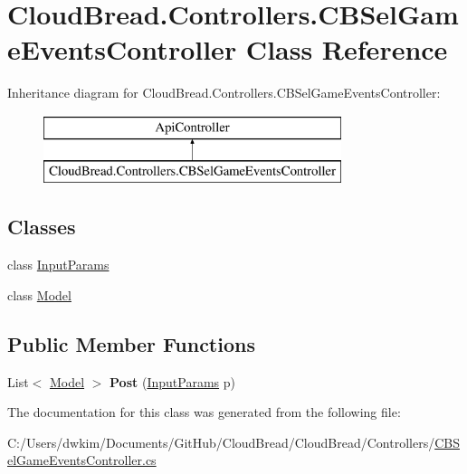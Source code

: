 \hypertarget{a00046}{}\section{Cloud\+Bread.\+Controllers.\+C\+B\+Sel\+Game\+Events\+Controller Class Reference}
\label{a00046}
Inheritance diagram for Cloud\+Bread.\+Controllers.\+C\+B\+Sel\+Game\+Events\+Controller\+:\begin{figure}[H]
\begin{center}
\leavevmode
\includegraphics[height=2.000000cm]{a00046}
\end{center}
\end{figure}
\subsection*{Classes}
\begin{DoxyCompactItemize}
\item 
class \hyperlink{a00119}{Input\+Params}
\item 
class \hyperlink{a00166}{Model}
\end{DoxyCompactItemize}
\subsection*{Public Member Functions}
\begin{DoxyCompactItemize}
\item 
List$<$ \hyperlink{a00166}{Model} $>$ {\bfseries Post} (\hyperlink{a00119}{Input\+Params} p)\hypertarget{a00046_a4b7d48b96dfb8d43e274be9d685e824c}{}\label{a00046_a4b7d48b96dfb8d43e274be9d685e824c}

\end{DoxyCompactItemize}


The documentation for this class was generated from the following file\+:\begin{DoxyCompactItemize}
\item 
C\+:/\+Users/dwkim/\+Documents/\+Git\+Hub/\+Cloud\+Bread/\+Cloud\+Bread/\+Controllers/\hyperlink{a00217}{C\+B\+Sel\+Game\+Events\+Controller.\+cs}\end{DoxyCompactItemize}
